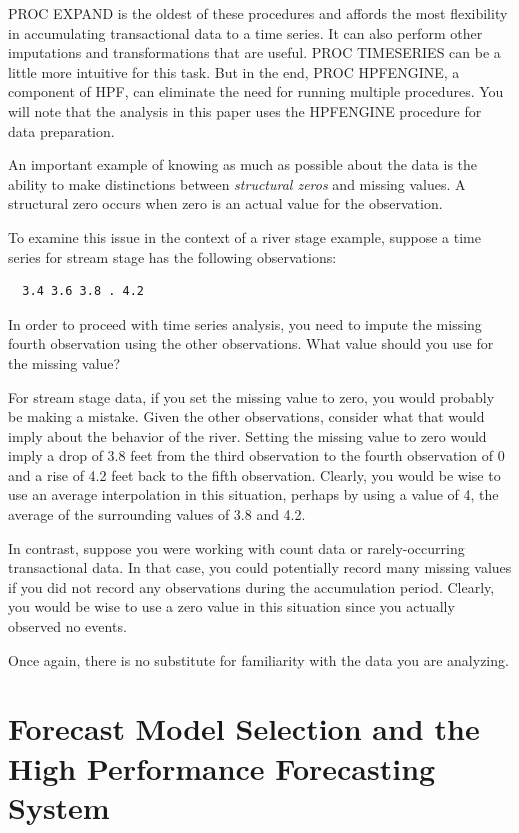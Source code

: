 \documentclass[10pt]{sugconf-ish}
\begin{document}
PROC EXPAND is the oldest of these procedures and affords the most flexibility in accumulating transactional data to a time series. It can also perform other imputations and transformations that are useful. PROC TIMESERIES can be a little more intuitive for this task. But in the end, PROC HPFENGINE, a component of HPF, can eliminate the need for running multiple procedures. You will note that the analysis in this paper uses the HPFENGINE procedure for data preparation.

An important example of knowing as much as possible about the data is the ability to make distinctions between \emph{structural zeros} and missing values. A structural zero occurs when zero is an actual value for the observation.

To examine this issue in the context of a river stage example, suppose a time series for stream stage has the following observations:
\vspace*{-0.5\baselineskip}
\begin{verbatim}
  3.4 3.6 3.8 . 4.2
\end{verbatim}
\vspace*{-0.5\baselineskip}
In order to proceed with time series analysis, you need to impute the missing fourth observation using the other observations. What value should you use for the missing value?

For stream stage data, if you set the missing value to zero, you would probably be making a mistake. Given the other observations, consider what that would imply about the behavior of the river. Setting the missing value to zero would imply a drop of 3.8 feet from the third observation to the fourth observation of 0 and a rise of 4.2 feet back to the fifth observation. Clearly, you would be wise to use an average interpolation in this situation, perhaps by using a value of 4, the average of the surrounding values of 3.8 and 4.2.

In contrast, suppose you were working with count data or rarely-occurring transactional data. In that case, you could potentially record many missing values if you did not record any observations during the accumulation period. Clearly, you would be wise to use a zero value in this situation since you actually observed no events.

Once again, there is no substitute for familiarity with the data you are analyzing.




\section{Forecast Model Selection and the High Performance Forecasting System}
\end{document}
